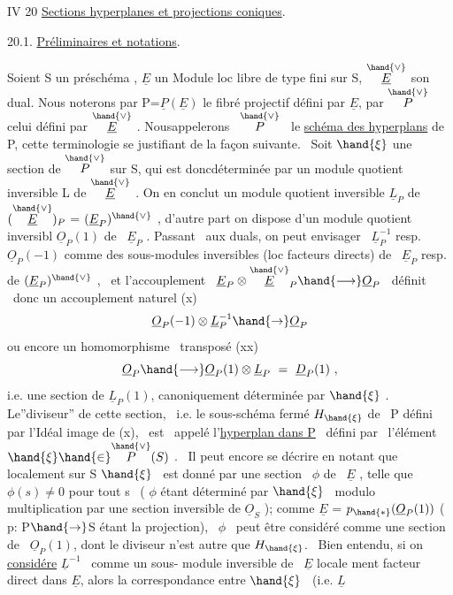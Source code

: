 IV 20 \quad \uline{Sections hyperplanes et projections coniques}.

20.1. \quad \uline{Préliminaires et notations}.

Soient S un \quad préschéma , $\underline{E}$ un Module loc libre de type fini sur S,
$\overset{\hand{\vee}}{\underline{E}}$ son dual. Nous noterons par P=$\underline{P}(\underline{E})$ le fibré projectif défini par $\underline{E}$,
par $\overset{\hand{\vee}}{P}$ celui défini par $\overset{\hand{\vee}}{\underline{E}}$ . Nousappelerons \ $\overset{\hand{\vee}}{P}$ \ le \uline{schéma des hyperplans}
de P, cette terminologie se justifiant de la façon suivante. \ Soit
$\hand{\xi}$ une section de $\overset{\hand{\vee}}{P}$ sur S, qui est donc\hand{/}déterminée par un module quotient
inversible L de $\overset{\hand{\vee}}{\underline{E}}$ . On en conclut un module quotient inversible
$\underline{L}_P$ de$(\overset{\hand{\vee}}{\underline{E}})_P$ = $(\underline{E}_P)^{\hand{\vee}}$ , d'autre part on dispose d'un module quotient inversibl
$\underline{O}_P(1)$ de \ $\underline{E}_P$ . Passant \ aux duals, on peut envisager \ $\underline{L}_P^{-1}$ resp. $\underline{O}_P(-1)$
comme des sous-modules inversibles (loc facteurs directs) de \ $\underline{E}_P$ resp.
de $(\underline{E}_P)^{\hand{\vee}}$ , \ et l'accouplement \ $\underline{E}_P \otimes \overset{\hand{\vee}}{\underline{E}}_P \hand{\longrightarrow} \underline{O}_P$ \ définit \ donc un
accouplement naturel
(x) \[ \underline{O}_P(-1)\otimes\underline{L}_P^{-1} \hand{\to} \underline{O}_P \]
ou encore un homomorphisme \ transposé
\placedmargin{$\|$}
(xx) \[ \underline{O}_P \hand{\longrightarrow} \underline{O}_P(1)\otimes\underline{L}_P \ = \ \underline{D}_P(1) \ , \]
i.e. une section de $\underline{L}_P(1)$, canoniquement déterminée par $\hand{\xi}$ . Le''diviseur''
de cette section, \ i.e. le sous-schéma fermé $H_{\hand{\xi}}$ de \ P défini par l'Idéal
image de (x), \ est \ appelé l'\uline{hyperplan dans P} \ défini par \ l'élément
$\hand{\xi} \hand{\in} \overset{\hand{\vee}}{P}(S)$ . \ Il peut encore se décrire en notant que localement sur S 
 \quad $\hand{\xi}$ \ est donné par une section \ $\phi$ de \ $\underline{E}$ ,  telle
 que $\phi(s) \neq 0$ pour tout s \ ( $\phi$ étant déterminé par $\hand{\xi}$ \ modulo
multiplication par une section inversible de $\underline{O}_S$ ); comme $\underline{E}$ = $p_{\hand{*}}(\underline{O}_P(1))$
( p: P$\hand{\to}$S étant la projection), \ $\phi$ \ peut être considéré comme une section
de \ $\underline{O}_P(1)$, dont le diviseur n'est autre que $H_{\hand{\xi}}$. \ Bien entendu, si on
\uline{considére} $\underline{L}^{-1}$ \ comme un sous- module inversible de \ $\underline{E}$ locale
ment facteur direct dans $\underline{E}$, alors la correspondance entre $\hand{\xi}$ \ (i.e. $\underline{L}$ \hand{\unsure{$\xi$,}}

